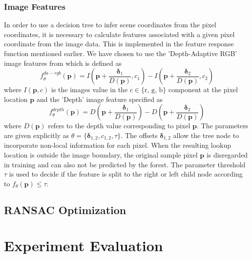 \documentclass[final]{cvpr}
\begin{document}
\subsubsection{Image Features}
In order to use a decision tree to infer scene coordinates from the pixel coordinates,
it is necessary to calculate features associated with a given pixel coordinate from the
image data. This is implemented in the feature response function mentioned earlier.
We have chosen to use the 'Depth-Adaptive RGB' image features from \cite{shotton2013} which
is defined as
\begin{equation}
	f_{\theta}^{da-rgb}(\boldsymbol{p}) = I\left(\boldsymbol{p} + \frac{\boldsymbol{\delta}_1}{D(\boldsymbol{p})}, c_1\right)
	- I\left(\boldsymbol{p} + \frac{\boldsymbol{\delta}_2}{D(\boldsymbol{p})}, c_2\right)
\end{equation}
where $I(\boldsymbol{p}, c)$ is the images value in the $c \in \{\text{r, g, b}\}$ component at
the pixel location $\boldsymbol{p}$ and the 'Depth' image feature specified as
\begin{equation}
	f_{\theta}^{depth}(\boldsymbol{p}) = D\left(\boldsymbol{p} + \frac{\boldsymbol{\delta}_1}{D(\boldsymbol{p})}\right)
	- D\left(\boldsymbol{p} + \frac{\boldsymbol{\delta}_2}{D(\boldsymbol{p})}\right)
\end{equation}
where $D(\boldsymbol{p})$ refers to the depth value corresponding to pixel $\boldsymbol{p}$.
The parameters are given explicitly as $\theta = \{\boldsymbol{\delta}_{1,2}, c_{1,2}, \tau\}$. 
The offsets $\boldsymbol{\delta}_{1,2}$
allow the tree node to incorporate non-local information for each pixel. When the resulting
lookup location is outside the image boundary, the original sample pixel $\boldsymbol{p}$ is
disregarded in training and can also not be predicted by the forest. The parameter threshold 
$\tau$ is used to decide if the feature is split to the right or left child node according to 
$f_{\theta}(\boldsymbol{p}) \leq \tau$.


\subsection{RANSAC Optimization}

\section{Experiment Evaluation}
\end{document}
